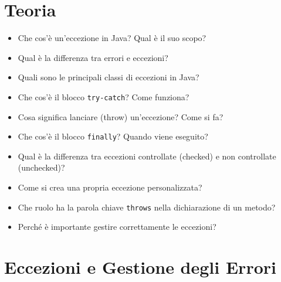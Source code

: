 \documentclass{article}
\begin{document}
\section{Teoria}

\begin{itemize}
    \item Che cos'è un'eccezione in Java? Qual è il suo scopo?
    \item Qual è la differenza tra errori e eccezioni?
    \item Quali sono le principali classi di eccezioni in Java?
    \item Che cos'è il blocco \texttt{try-catch}? Come funziona?
    \item Cosa significa lanciare (throw) un'eccezione? Come si fa?
    \item Che cos'è il blocco \texttt{finally}? Quando viene eseguito?
    \item Qual è la differenza tra eccezioni controllate (checked) e non controllate (unchecked)?
    \item Come si crea una propria eccezione personalizzata?
    \item Che ruolo ha la parola chiave \texttt{throws} nella dichiarazione di un metodo?
    \item Perché è importante gestire correttamente le eccezioni?
\end{itemize}

\section{Eccezioni e Gestione degli Errori}
\end{document}
